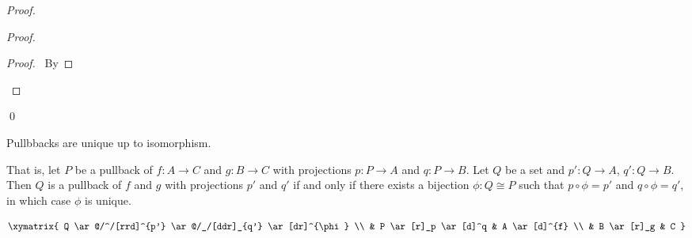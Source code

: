 \begin{proof}
 \pf
 \begin{proof}
   \pf
   \begin{proof}
     \pf\ By 
   \end{proof}
 \end{proof}
 \qed
\end{proof}

\begin{prop}
 Pullbbacks are unique up to isomorphism.

 That is, let $P$ be a pullback of $f : A \rightarrow C$ and $g : B
\rightarrow C$ with projections $p : P \rightarrow A$ and $q : P \rightarrow
B$. Let $Q$ be a set and $p' : Q \rightarrow A$, $q' : Q \rightarrow B$. Then
$Q$ is a pullback of $f$ and $g$ with projections $p'$ and $q'$ if and only if
there exists a bijection $\phi : Q \cong P$ such that $p \circ \phi = p'$ and
$q \circ \phi = q'$, in which case $\phi$ is unique.

 \[ \xymatrix{
   Q \ar@/^/[rrd]^{p'} \ar@/_/[ddr]_{q'} \ar[dr]^{\phi} \\
  & P \ar[r]_p \ar[d]^q & A \ar[d]^{f} \\
  & B \ar[r]_g & C
}
 \]

\end{prop}

